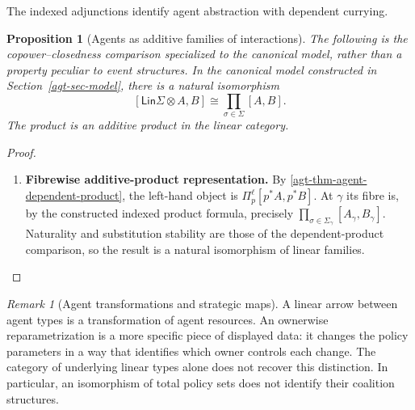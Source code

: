 \documentclass[11pt,a4paper]{article}
\numberwithin{equation}{section}
\newtheorem{proposition}[theorem]{Proposition}
\theoremstyle{definition}
\theoremstyle{remark}
\newtheorem{remark}[theorem]{Remark}
\theoremstyle{plain}
\providecommand{\Lin}{\mathsf{Lin}}
\begin{document}
\noindent The indexed adjunctions identify agent abstraction with dependent currying.
\begin{center}
\end{center}

\begin{proposition}[Agents as additive families of interactions]
\label{agt-prop-agent-product}
The following is the copower--closedness comparison specialized to the
canonical model, rather than a property peculiar to event structures.
In the canonical model constructed in Section~\ref{agt-sec-model}, there is
a natural isomorphism
\[
 [\Lin\Sigma\otimes A,B]
 \cong\prod_{\sigma\in\Sigma}[A,B].
\]
The product is an additive product in the linear category.
\end{proposition}
\begin{proof}
\leavevmode
\begin{enumerate}[label=\textup{(\arabic*)},leftmargin=*,itemsep=4pt,topsep=3pt]
  \item \textbf{Fibrewise additive-product representation.} By \cref{agt-thm-agent-dependent-product}, the left-hand object is
$\Pi_p^\ell[p^*A,p^*B]$. At $\gamma$ its fibre is, by the
constructed indexed product formula, precisely
$\prod_{\sigma\in\Sigma_\gamma}[A_\gamma,B_\gamma]$. Naturality and substitution stability are those of the dependent-product
comparison, so the result is a natural isomorphism of linear families.
\end{enumerate}
\end{proof}

\begin{remark}[Agent transformations and strategic maps]
A linear arrow between agent types is a transformation of agent resources.
An ownerwise reparametrization is a more specific piece of displayed data:
it changes the policy parameters in a way that identifies which owner
controls each change. The category of underlying linear types alone does
not recover this distinction. In particular, an isomorphism of total policy
sets does not identify their coalition structures.
\end{remark}
\end{document}
